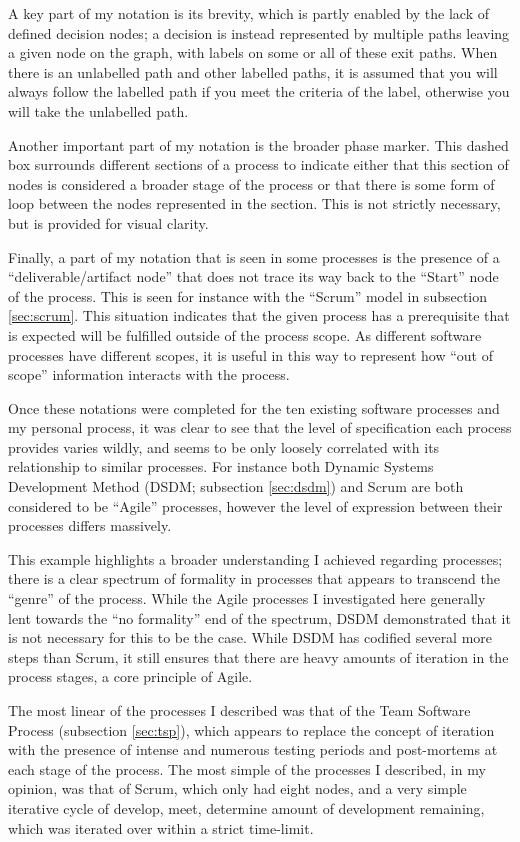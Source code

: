 \documentclass[a4paper,10pt]{article}
\begin{document}
A key part of my notation is its brevity, which is partly enabled by the lack of defined decision nodes; a decision is instead represented by multiple paths leaving a given node on the graph, with labels on some or all of these exit paths. When there is an unlabelled path and other labelled paths, it is assumed that you will always follow the labelled path if you meet the criteria of the label, otherwise you will take the unlabelled path. 

Another important part of my notation is the broader phase marker. This dashed box surrounds different sections of a process to indicate either that this section of nodes is considered a broader stage of the process or that there is some form of loop between the nodes represented in the section. This is not strictly necessary, but is provided for visual clarity.

Finally, a part of my notation that is seen in some processes is the presence of a ``deliverable/artifact node'' that does not trace its way back to the ``Start'' node of the process. This is seen for instance with the ``Scrum'' model in subsection \ref{sec:scrum}. This situation indicates that the given process has a prerequisite that is expected will be fulfilled outside of the process scope. As different software processes have different scopes, it is useful in this way to represent how ``out of scope'' information interacts with the process.

Once these notations were completed for the ten existing software processes and my personal process, it was clear to see that the level of specification each process provides varies wildly, and seems to be only loosely correlated with its relationship to similar processes. For instance both Dynamic Systems Development Method (DSDM; subsection \ref{sec:dsdm}) and Scrum are both considered to be ``Agile'' processes, however the level of expression between their processes differs massively. 

This example highlights a broader understanding I achieved regarding processes; there is a clear spectrum of formality in processes that appears to transcend the ``genre'' of the process. While the Agile processes I investigated here generally lent towards the ``no formality'' end of the spectrum, DSDM demonstrated that it is not necessary for this to be the case. While DSDM has codified several more steps than Scrum, it still ensures that there are heavy amounts of iteration in the process stages, a core principle of Agile.

The most linear of the processes I described was that of the Team Software Process (subsection \ref{sec:tsp}), which appears to replace the concept of iteration with the presence of intense and numerous testing periods and post-mortems at each stage of the process. The most simple of the processes I described, in my opinion, was that of Scrum, which only had eight nodes, and a very simple iterative cycle of develop, meet, determine amount of development remaining, which was iterated over within a strict time-limit.
\end{document}
